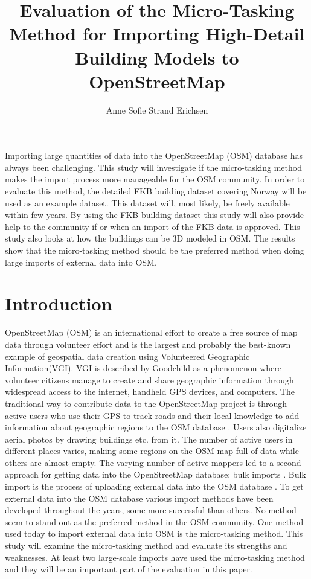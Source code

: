\documentclass[12pt, a4paper]{report}   	%
\title{Evaluation of the Micro-Tasking Method for Importing High-Detail Building Models to OpenStreetMap}
\author{Anne Sofie Strand Erichsen}
\begin{document}
\maketitle

\abstract
Importing large quantities of data into the OpenStreetMap (OSM) database has always been challenging. This study will investigate if the micro-tasking method makes the import process more manageable for the OSM community. In order to evaluate this method, the detailed FKB building dataset covering Norway will be used as an example dataset. This dataset will, most likely, be freely available within few years. By using the FKB building dataset this study will also provide help to the community if or when an import of the FKB data is approved. This study also looks at how the buildings can be 3D modeled in OSM. The results show that the micro-tasking method should be the preferred method when doing large imports of external data into OSM. 



\setcounter{page}{1}

\chapter{Introduction}\label{sec:intro}
OpenStreetMap (OSM) is an international effort to create a free source of map data through volunteer effort \cite{Goodchild2007} and is the largest and probably the best-known example of geospatial data creation using Volunteered Geographic Information(VGI).  VGI is described by Goodchild as a phenomenon where volunteer citizens manage to create and share geographic information through widespread access to the internet, handheld GPS devices, and computers. The traditional way to contribute data to the OpenStreetMap project is through active users who use their GPS to track roads and their local knowledge to add information about geographic regions to the OSM database \cite{Zielstra2013}. Users also digitalize aerial photos by drawing buildings etc. from it. The number of active users in different places varies, making some regions on the OSM map full of data while others are almost empty. The varying number of active mappers led to a second approach for getting data into the OpenStreetMap database; bulk imports \cite{Zielstra2013}.  Bulk import is the process of uploading external data into the OSM database \cite{Zielstra2013}. To get external data into the OSM database various import methods have been developed throughout the years, some more successful than others. No method seem to stand out as the preferred method in the OSM community. One method used today to import external data into OSM is the micro-tasking method. This study will examine the micro-tasking method and evaluate its strengths and weaknesses. At least two large-scale imports have used the micro-tasking method and they will be an important part of the evaluation in this paper.
\end{document}
